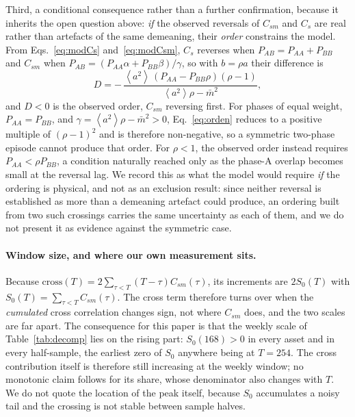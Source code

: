 \documentclass[aps,pre,twocolumn,superscriptaddress,floatfix,nofootinbib]{revtex4-2}
\newcommand{\avg}[1]{\left\langle #1 \right\rangle}
\begin{document}
Third, a conditional consequence rather than a further confirmation, because it
inherits the open question above: \emph{if} the observed reversals of
$C_{sm}$ and $C_s$ are real rather than artefacts of the same demeaning, their
\emph{order} constrains the model. From Eqs.~\eqref{eq:modCs}
and~\eqref{eq:modCsm}, $C_s$ reverses when $P_{AB}=P_{AA}+P_{BB}$ and $C_{sm}$
when $P_{AB}=(P_{AA}\alpha+P_{BB}\beta)/\gamma$, so with $b=\rho a$ their
difference is
\begin{equation}
  D=-\,\frac{\avg{a^2}\,(P_{AA}-P_{BB}\rho)(\rho-1)}
           {\avg{a^2}\rho-\bar m^2} ,
  \label{eq:orden}
\end{equation}
and $D<0$ is the observed order, $C_{sm}$ reversing first. For phases of equal
weight, $P_{AA}=P_{BB}$, and $\gamma=\avg{a^2}\rho-\bar m^2>0$,
Eq.~\eqref{eq:orden} reduces to a positive multiple of $(\rho-1)^2$ and is
therefore non-negative, so a symmetric
two-phase episode cannot produce that order. For $\rho<1$, the observed order
instead requires $P_{AA}<\rho P_{BB}$, a condition naturally reached only as
the phase-A overlap becomes small at the reversal lag. We record this as what the
model would require \emph{if} the ordering is physical, and not as an
exclusion result: since neither reversal is established as more than a
demeaning artefact could produce, an ordering built from two such crossings
carries the same uncertainty as each of them, and we do not present it as
evidence against the symmetric case.

\paragraph*{Window size, and where our own measurement sits.}
Because $\mathrm{cross}(T)=2\sum_{\tau<T}(T-\tau)C_{sm}(\tau)$, its increments
are $2S_0(T)$ with $S_0(T)=\sum_{\tau<T}C_{sm}(\tau)$. The cross term therefore
turns over when the \emph{cumulated} cross correlation changes sign, not where
$C_{sm}$ does, and the two scales are far apart. The consequence for this paper
is that the weekly scale of Table~\ref{tab:decomp} lies on the rising part:
$S_0(168)>0$ in every asset and in every half-sample, the earliest zero of
$S_0$ anywhere being at $T=254$. The cross contribution itself is therefore
still increasing at the weekly window; no monotonic claim follows for its
share, whose denominator also changes with $T$. We do not quote the location of
the peak itself, because $S_0$ accumulates a noisy tail and the crossing is not
stable between sample halves.
\end{document}
